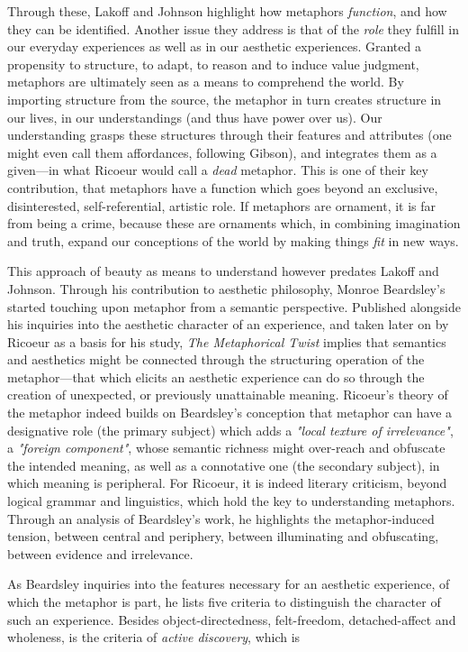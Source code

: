 \documentclass{article}
\begin{document}
Through these, Lakoff and Johnson highlight how metaphors \emph{function}, and how they can be identified. Another issue they address is that of the \emph{role} they fulfill in our everyday experiences as well as in our aesthetic experiences. Granted a propensity to structure, to adapt, to reason and to induce value judgment, metaphors are ultimately seen as a means to comprehend the world. By importing structure from the source, the metaphor in turn creates structure in our lives, in our understandings (and thus have power over us). Our understanding grasps these structures through their features and attributes (one might even call them affordances, following Gibson\cite{gibson_ecological_1986}), and integrates them as a given—in what Ricoeur would call a \emph{dead} metaphor. This is one of their key contribution, that metaphors have a function which goes beyond an exclusive, disinterested, self-referential, artistic role. If metaphors are ornament, it is far from being a crime, because these are ornaments which, in combining imagination and truth, expand our conceptions of the world by making things \emph{fit} in new ways.

This approach of beauty as means to understand however predates Lakoff and Johnson. Through his contribution to aesthetic philosophy, Monroe Beardsley's started touching upon metaphor from a semantic perspective. Published alongside his inquiries into the aesthetic character of an experience, and taken later on by Ricoeur as a basis for his study, \emph{The Metaphorical Twist} implies that semantics and aesthetics might be connected through the structuring operation of the metaphor—that which elicits an aesthetic experience can do so through the creation of unexpected, or previously unattainable meaning. Ricoeur's theory of the metaphor indeed builds on Beardsley's conception that metaphor can have a designative role (the primary subject) which adds a \emph{"local texture of irrelevance"}, a \emph{"foreign component"}, whose semantic richness might over-reach and obfuscate the intended meaning, as well as a connotative one (the secondary subject), in which meaning is peripheral. For Ricoeur, it is indeed literary criticism, beyond logical grammar and linguistics, which hold the key to understanding metaphors. Through an analysis of Beardsley's work, he highlights the metaphor-induced tension, between central and periphery, between illuminating and obfuscating, between evidence and irrelevance.

As Beardsley inquiries into the features necessary for an aesthetic experience, of which the metaphor is part, he lists five criteria to distinguish the character of such an experience. Besides object-directedness, felt-freedom, detached-affect and wholeness, is the criteria of \emph{active discovery}, which is
\end{document}
